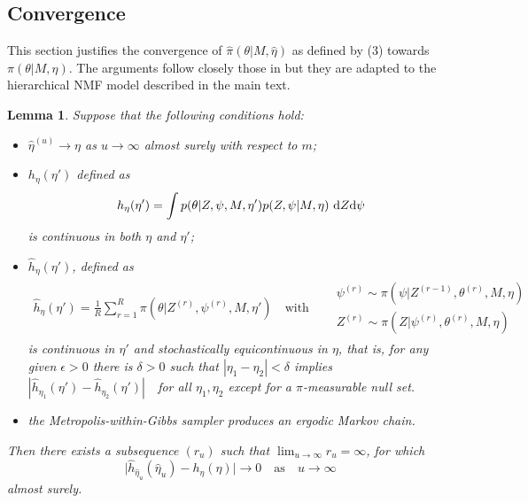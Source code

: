 \documentclass[11pt]{amsart}
\newtheorem{lemma}{Lemma}
\theoremstyle{definition}
\begin{document}
\subsection{Convergence}
This section justifies the convergence of $\widehat\pi(\theta|M,
\hat\eta)$ as defined by (3) towards $\pi(\theta|M, \eta)$. The
arguments follow closely those in \cite{C01} but they are
adapted to the hierarchical NMF model described in the main text.
\begin{lemma}\label{lem:technical} Suppose that the following
  conditions hold:
\begin{itemize}
 \item[(i)] $\hat\eta^{(u)} \to \eta$ as $u \to \infty$ almost
   surely with respect to $m$;
 \item[(ii)] $h_\eta(\eta')$ defined as
\[
  h_{\eta}(\eta')
   =
 \int p(\theta|Z, \psi, M, \eta')p(Z, \psi|M, \eta)\
 \textup{d} Z \textup{d} \psi
\]
is continuous in both $\eta$ and $\eta'$;
\item[(iii)] $\widehat h_\eta(\eta')$, defined as
\begin{align*}
  \widehat h_\eta(\eta')
  =
 \frac{1}{R}\sum_{r=1}^R \pi(\theta|Z^{(r)}, \psi^{(r)}, M, \eta')
    \quad \text{with}\quad
   \begin{aligned}
      &\psi^{(r)} \sim \pi(\psi|Z^{(r-1)}, \theta^{(r)}, M, \eta)\\
      &Z^{(r)} \sim \pi(Z| \psi^{(r)}, \theta^{(r)}, M, \eta)
   \end{aligned}
\end{align*}
 is continuous in $\eta'$ and stochastically equicontinuous in $\eta$,
that is, for any given $\epsilon > 0$ there is $\delta>0$ such that
$|\eta_1 - \eta_2| < \delta$ implies $|\widehat h_{\eta_1}(\eta') -
\widehat h_{\eta_2}(\eta')|$\ \ for all $\eta_1, \eta_2$ except for a
$\pi$-measurable null set.
 \item[(iv)] the Metropolis-within-Gibbs sampler produces an ergodic
   Markov chain.
\end{itemize}
Then there exists a subsequence $(r_u)$ such that $\lim_{u\to\infty}
r_u  = \infty$, for which
\[
   \big|\widehat h_{\hat\eta_u}(\hat\eta_u) - h_\eta(\eta)\big| \to 0
  \quad\text{as}\quad
   u \to \infty
\]
almost surely. %
\end{lemma}
\end{document}
